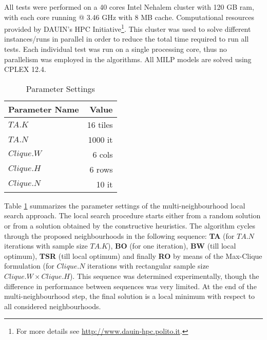 \documentclass[preprint,12pt]{elsarticle}
\begin{document}
All tests were performed on a 40 cores Intel Nehalem cluster with 120 GB ram, with each core running @ 3.46 GHz with 8 MB cache.
Computational resources provided by DAUIN's HPC Initiative\footnote{For more details see  \url{http://www.dauin-hpc.polito.it}.}.
This cluster was used to solve different instances/runs in parallel in order to reduce the total time required to run all tests. 
Each individual test was run on a single processing core, thus no parallelism was employed in the algorithms.
All MILP models are solved using CPLEX 12.4. %

\bigskip

\begin{table}[h]
	\centering
		\begin{tabular}{lr}
		\hline
		\textbf{Parameter Name} & \textbf{Value}\\\hline
		$TA.K$ & 16 tiles\\
		$TA.N$ & 1000 it\\
		$Clique.W$ & 6 cols\\
		$Clique.H$ & 6 rows\\
		$Clique.N$ & 10 it\\
\hline
		\end{tabular}
	\caption{Parameter Settings}
	\label{tab:param}
\end{table}
\noindent
Table \ref{tab:param} summarizes the parameter settings of the  multi-neighbourhood local search approach. The local search procedure starts either from a random solution or from a solution obtained by the constructive heuristics. The algorithm cycles through the proposed neighbourhoods in the following sequence: \textbf{TA} (for $TA.N$ iterations with sample size $TA.K$), \textbf{BO} (for one iteration), \textbf{BW} (till local optimum), \textbf{TSR} (till local optimum) and finally \textbf{RO} by means of the Max-Clique formulation (for $Clique.N$ iterations with rectangular sample size $Clique.W\times Clique.H$). 
This sequence was determined experimentally, though the difference in performance between sequences was very limited.
At the end of the multi-neighbourhood step, the final solution is a local minimum with respect to 
all considered neighbourhoods.
\\
\end{document}
